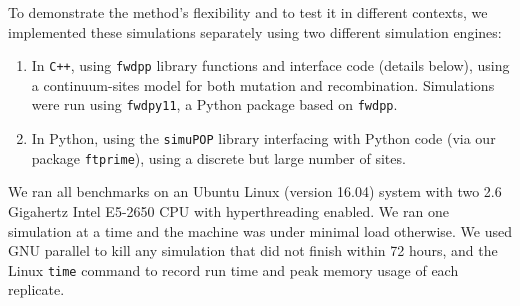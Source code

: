 \documentclass{article}
\newcommand{\simupop}{\texttt{simuPOP}}
\newcommand{\fwdpp}{\texttt{fwdpp}}
\newcommand{\fwdpy}{\texttt{fwdpy11}}
\newcommand{\cpp}{\texttt{C++}}
\newcommand{\ftprime}{\texttt{ftprime}}
\newcommand{\krt}[1]{{\em \color{green} #1}}
\begin{document}
To demonstrate the method's flexibility and to test it in different contexts,
we implemented these simulations separately using two different simulation engines:
\begin{enumerate}

    \item
        In \cpp{}, using \fwdpp{} library functions and interface code (details below),
        using a continuum-sites model for both mutation and recombination. Simulations were run using \fwdpy{}, a Python
        package based on \fwdpp.

    \item
        In Python, using the \simupop{} library interfacing with Python code
	(via our package \ftprime{}),
        using a discrete but large number of sites.

\end{enumerate}

We ran all benchmarks on an Ubuntu Linux (version 16.04) system with two 2.6 Gigahertz Intel E5-2650 CPU with
hyperthreading enabled.
We ran one simulation at a time and the machine was under minimal load otherwise.
We used GNU parallel \citep{Tange2011a} to kill any simulation that did not finish within 72 hours,
and the Linux \texttt{time} command to record run time and peak memory usage of each replicate.

\end{document}
